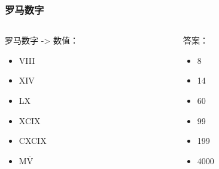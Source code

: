 \begin{frame}\frametitle{罗马数字}
	\begin{columns}[c]
		\begin{column}{.45\textwidth}
			\begin{exampleblock}{罗马数字 -> 数值：}
				\begin{itemize}
					\item<2-> VIII
					\item<4-> XIV
					\item<6-> LX
					\item<8-> XCIX
					\item<10-> CXCIX
					\item<12-> M$\overline{\text{V}}$
				\end{itemize}
			\end{exampleblock}
		\end{column}
		\begin{column}{.45\textwidth}
			\begin{alertblock}{答案：}
				\begin{itemize}
					\item<3-> 8
					\item<5-> 14
					\item<7-> 60
					\item<9-> 99
					\item<11-> 199
					\item<13-> 4000
				\end{itemize}
			\end{alertblock}
		\end{column}
	\end{columns}
\end{frame}

